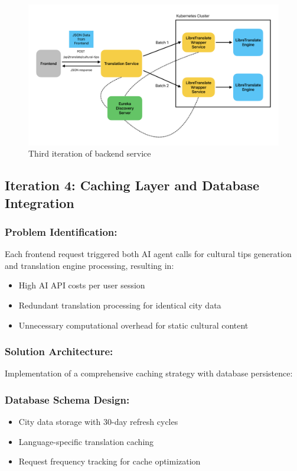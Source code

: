 \begin{figure}[H]
    \centering
    \includegraphics[width=1\linewidth]{chapter/05_implementation/backend/B_architectural_design/Backend_Iteration_3.pdf}
    \caption{Third iteration of backend service}
    \label{fig:backend_iteration_3}
\end{figure}

\subsection{Iteration 4: Caching Layer and Database Integration}

\subsubsection{Problem Identification:} Each frontend request triggered both AI agent calls for cultural tips generation and translation engine processing, resulting in:
\begin{itemize}
    \item High AI API costs per user session
    \item Redundant translation processing for identical city data
    \item Unnecessary computational overhead for static cultural content
\end{itemize}

\subsubsection{Solution Architecture:}
Implementation of a comprehensive caching strategy with database persistence:

\subsubsection{Database Schema Design:}
\begin{itemize}
    \item City data storage with 30-day refresh cycles
    \item Language-specific translation caching
    \item Request frequency tracking for cache optimization
\end{itemize}

